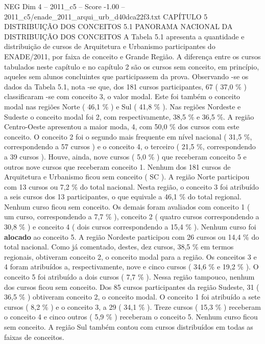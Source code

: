 \begin{textsample}{NEG Dim 4 – 2011\_c5 – Score -1.00 – 2011\_c5/enade\_2011\_arqui\_urb\_d40dca22f3.txt}  \label{ex:f4_neg_116}
CAPÍTULO 5 DISTRIBUIÇÃO DOS CONCEITOS 5.1 PANORAMA NACIONAL DA DISTRIBUIÇÃO DOS CONCEITOS A Tabela 5.1 apresenta a quantidade e distribuição de cursos de Arquitetura e Urbanismo participantes do ENADE/2011, por faixa de conceito e Grande Região.
A diferença entre os cursos tabulados neste capítulo e no capítulo 2 são os cursos sem conceito, em princípio, aqueles sem alunos concluintes que participassem da prova.
Observando -se os dados da Tabela 5.1, nota -se que, dos 181 cursos participantes, 67 ( 37,0 \% ) classificaram -se com conceito 3, o valor modal.
Este foi também o conceito modal nas regiões Norte ( 46,1 \% ) e Sul ( 41,8 \% ).
Nas regiões Nordeste e Sudeste o conceito modal foi 2, com respectivamente, 38,5 \% e 36,5 \%.
A região Centro-Oeste apresentou a maior moda, 4, com 50,0 \% dos cursos com este conceito.
O conceito 2 foi o segundo mais frequente em nível nacional ( 31,5 \%, correspondendo a 57 cursos ) e o conceito 4, o terceiro ( 21,5 \%, correspondendo a 39 cursos ).
Houve, ainda, nove cursos ( 5,0 \% ) que receberam conceito 5 e outros nove cursos que receberam conceito 1.
Nenhum dos 181 cursos de Arquitetura e Urbanismo ficou sem conceito ( SC ).
A região Norte participou com 13 cursos ou 7,2 \% do total nacional.
Nesta região, o conceito 3 foi atribuído a seis cursos dos 13 participantes, o que equivale a 46,1 \% do total regional.
Nenhum curso ficou sem conceito.
Os demais foram avaliados com conceito 1 ( um curso, correspondendo a 7,7 \% ), conceito 2 ( quatro cursos correspondendo a 30,8 \% ) e conceito 4 ( dois cursos correspondendo a 15,4 \% ).
Nenhum curso foi \textbf{alocado} ao conceito 5.
A região Nordeste participou com 26 cursos ou 14,4 \% do total nacional.
Como já comentado, destes, dez cursos, 38,5 \% em termos regionais, obtiveram conceito 2, o conceito modal para a região.
Os conceitos 3 e 4 foram atribuídos a, respectivamente, nove e cinco cursos ( 34,6 \% e 19,2 \% ).
O conceito 5 foi atribuído a dois cursos ( 7,7 \% ).
Nessa região tampouco, nenhum dos cursos ficou sem conceito.
Dos 85 cursos participantes da região Sudeste, 31 ( 36,5 \% ) obtiveram conceito 2, o conceito modal.
O conceito 1 foi atribuído a sete cursos ( 8,2 \% ) e o conceito 3, a 29 ( 34,1 \% ).
Treze cursos ( 15,3 \% ) receberam o conceito 4 e cinco outros ( 5,9 \% ) receberam o conceito 5.
Nenhum curso ficou sem conceito.
A região Sul também contou com cursos distribuídos em todas as faixas de conceitos.

\end{textsample}
